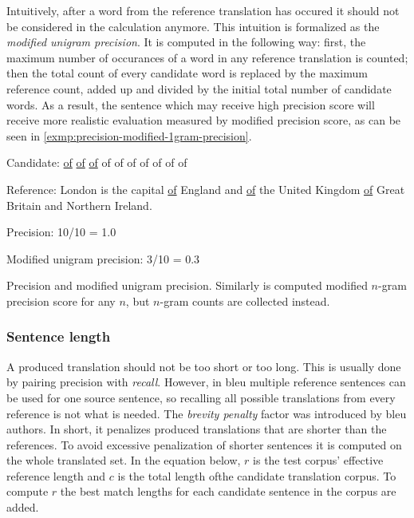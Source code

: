 Intuitively, after a word from the reference translation has occured it should not be considered
in the calculation anymore.
This intuition is formalized as the \textit{modified unigram precision}.
It is computed in the following way: first, the maximum number of occurances of a word in any
reference translation is counted; then the total count of every candidate word is replaced by the
maximum reference count, added up and divided by the initial total number of candidate words.
As a result, the sentence which may receive high precision score will receive more realistic evaluation
measured by modified precision score, as can be seen in
\cref{exmp:precision-modified-1gram-precision}.

\begin{minipage}{0.9\textwidth}

	Candidate: \underline{of} \underline{of} \underline{of} of of of of of of of

	Reference: London is the capital \underline{of} England and \underline{of} the United Kingdom
	\underline{of} Great Britain and Northern Ireland.

	Precision: 10/10 = 1.0

	Modified unigram precision: 3/10 = 0.3

	\begin{exmp}
	Precision and modified unigram precision.
	Similarly is computed modified $n$-gram precision score for any $n$,
	but $n$-gram counts are collected instead.
	\label{exmp:precision-modified-1gram-precision}
	\end{exmp}

\end{minipage}

\subsubsection*{Sentence length}

A produced translation should not be too short or too long.
This is usually done by pairing precision with \textit{recall}.
However, in \acrshort{bleu} multiple reference sentences can be used
for one source sentence, so recalling all possible translations from
every reference is not what is needed.
The \textit{brevity penalty} factor was introduced by \acrshort{bleu} authors.
In short, it penalizes produced translations that are shorter than the references.
To avoid excessive penalization of shorter sentences it is computed on the whole
translated set.
In the equation below,
$r$ is the test corpus’ effective reference length
and $c$ is the total length ofthe candidate translation corpus.
To compute $r$ the best match lengths for each candidate sentence
in the corpus are added.

